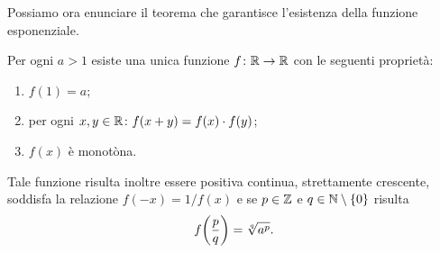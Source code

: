 Possiamo ora enunciare il teorema
che garantisce l'esistenza della funzione
esponenziale.

\begin{theorem}
\label{th:esponenziale}%
%
%
Per ogni $a>1$ esiste una unica funzione $f\colon \mathbb R \to \mathbb R$
con le seguenti proprietà:
\begin{enumerate}
\item $f(1) = a$;
\item per ogni $x,y\in \mathbb R\colon f(x+y) = f(x)\cdot f(y)$;
\item $f(x)$ è monotòna.
\end{enumerate}
Tale funzione risulta inoltre essere positiva
continua, strettamente crescente,
soddisfa la relazione $f(-x)= 1/f(x)$ e
se $p\in \mathbb Z$ e $q\in \mathbb N\setminus{\left\{ 0 \right\}}$ risulta
\[
  f{\left( \frac p q \right)} = \sqrt[q]{a^p}.
\]
\end{theorem}
%
